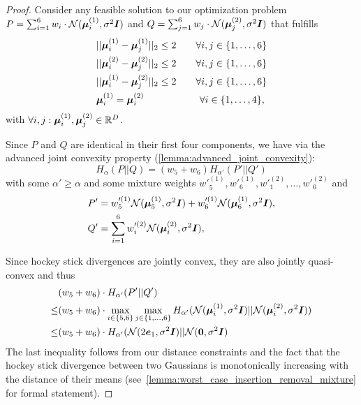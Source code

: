 \begin{proof}
    Consider any feasible solution to our optimization problem
    $P = \sum_{i=1}^{6} w_i \cdot \mathcal{N}({\bm{\mu}}^{(1)}_{i}, \sigma^2 {\bm{I}})$
    and
    $Q = \sum_{j=1}^{6} w_j \cdot \mathcal{N}({\bm{\mu}}^{(2)}_{j}, \sigma^2 {\bm{I}})$ that fulfills
    \begin{align}
        \begin{split}\label{eq:data_augmentation_constraints_2}
        & ||\vmu^{(1)}_i - \vmu^{(1)}_j||_2 \leq 2    \qquad \forall i,j \in \{1,\dots,6\} \\
        & ||\vmu^{(2)}_i - \vmu^{(2)}_j||_2 \leq 2    \qquad  \forall i,j \in \{1,\dots,6\}\\
        & ||\vmu^{(1)}_i - \vmu^{(2)}_j||_2 \leq 2   \qquad \forall i,j \in \{1,\dots,6\} \\
        & \vmu^{(1)}_i = \vmu^{(2)}_i  \qquad \qquad  \quad \ \ \forall i \in \{1,\dots,4\}, 
        \end{split}
    \end{align}
    with $\forall i,j  : {\bm{\mu}}^{(1)}_i, {\bm{\mu}}^{(2)}_j \in {\mathbb{R}}^D$.

    Since $P$ and $Q$ are identical in their first four components, we have via the advanced joint convexity property (\cref{lemma:advanced_joint_convexity}):
    \begin{equation*}
        H_\alpha(P || Q) = (w_5 + w_6) H_{\alpha'}(P' || Q')
    \end{equation*}
    with some $\alpha' \geq \alpha$ and some mixture weights $w'^{(1)}_5, w'^{(1)}_6, w'^{(2)}_1,\dots,w'^{(2)}_6$
    and 
    \begin{align*}
       & P' = w'^{(1)}_5 \mathcal{N}({\bm{\mu}}^{(1)}_5, \sigma^2 {\bm{I}})  +  w'^{(1)}_6 \mathcal{N}({\bm{\mu}}^{(1)}_6, \sigma^2 {\bm{I}}),\\
       & Q' = \sum_{i=1}^6 w'^{(2)}_i \mathcal{N}({\bm{\mu}}^{(2)}_i, \sigma^2 {\bm{I}}),
    \end{align*}

    Since hockey stick divergences are jointly convex, they are also jointly quasi-convex and thus
    \begin{align*}
    &
    (w_5 + w_6) \cdot 
    H_{\alpha'}(P' || Q')
    \\
    \leq 
    &
    (w_5 + w_6)
    \cdot 
    \max_{i \in \{5,6\}}
    \max_{j \in \{1,\dots,6\}}
    H_{\alpha'}(\mathcal{N}({\bm{\mu}}^{(1)}_i, \sigma^2 {\bm{I}}) || \mathcal{N}({\bm{\mu}}^{(2)}_i, \sigma^2 {\bm{I}}))
    \\
    \leq
    &
    (w_5 + w_6)
    \cdot 
    H_{\alpha'}(\mathcal{N}(2 {\bm{e}}_1, \sigma^2 {\bm{I}}) || \mathcal{N}({\bm{0}}, \sigma^2 {\bm{I}})
    \end{align*}
    The last inequality follows from our distance constraints and the fact that the hockey stick divergence between two Gaussians is monotonically increasing with the distance of their means (see~\cref{lemma:worst_case_insertion_removal_mixture} for formal statement).


\end{proof}

